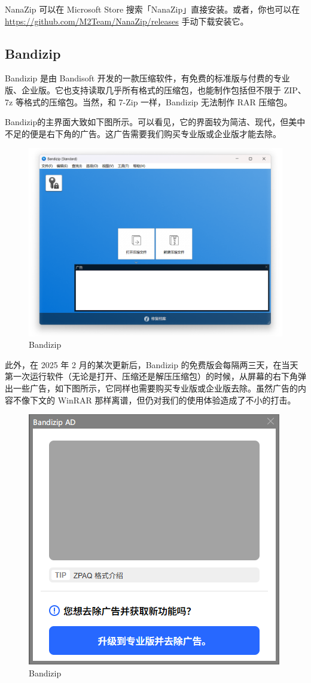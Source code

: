 {NanaZip 可以在 Microsoft Store 搜索「NanaZip」直接安装。或者，你也可以在 \url{https://github.com/M2Team/NanaZip/releases} 手动下载安装它。

\subsection{Bandizip}

Bandizip 是由 Bandisoft 开发的一款压缩软件，有免费的标准版与付费的专业版、企业版。它也支持读取几乎所有格式的压缩包，也能制作包括但不限于 ZIP、7z 等格式的压缩包。当然，和 7-Zip 一样，Bandizip 无法制作 RAR 压缩包。

Bandizip的主界面大致如下图所示。可以看见，它的界面较为简洁、现代，但美中不足的便是右下角的广告。这广告需要我们购买专业版或企业版才能去除。

\begin{figure}[htb!]
  \centering
  \includegraphics[width=.55\textwidth]{assets/software/Bandizip_main_window.png}
  \caption{Bandizip}
  \label{fig:Bandizip_main_window}
\end{figure}

此外，在 2025 年 2 月的某次更新后，Bandizip 的免费版会每隔两三天，在当天第一次运行软件（无论是打开、压缩还是解压压缩包）的时候，从屏幕的右下角弹出一些广告，如下图所示，它同样也需要购买专业版或企业版去除。虽然广告的内容不像下文的 WinRAR 那样离谱，但仍对我们的使用体验造成了不小的打击。

\begin{figure}[htb!]
  \centering
  \includegraphics[width=.45\textwidth]{assets/software/Bandizip_popup.png}
  \caption{Bandizip}
  \label{fig:Bandizip_popup}
\end{figure}

}
